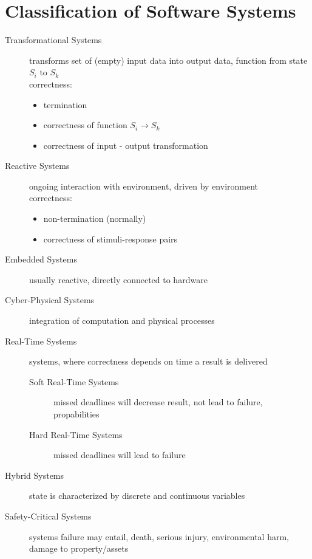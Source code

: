 \documentclass[a4paper, 10pt]{article}
\begin{document}
\section*{Classification of Software Systems}
\begin{description}
    \item[Transformational Systems] transforms set of (empty) input data into output data, function from state $S_i$ to $S_k$ \\ correctness:
    \begin{itemize}
        \item termination
        \item correctness of function $S_i\to S_k$
        \item correctness of input - output transformation
    \end{itemize}
    \item[Reactive Systems] ongoing interaction with environment, driven by environment \\ correctness:
    \begin{itemize}
        \item non-termination (normally)
        \item correctness of stimuli-response pairs
    \end{itemize}
    \item[Embedded Systems] usually reactive, directly connected to hardware
    \item[Cyber-Physical Systems] integration of computation and physical processes
    \item[Real-Time Systems] systems, where correctness depends on time a result is delivered
    \begin{description}
        \item[Soft Real-Time Systems] missed deadlines will decrease result, not lead to failure, propabilities
        \item[Hard Real-Time Systems] missed deadlines will lead to failure
    \end{description}
    \item[Hybrid Systems] state is characterized by discrete and continuous variables
    \item[Safety-Critical Systems] systems failure may entail, death, serious injury, environmental harm, damage to property/assets
\end{description}
\end{document}
